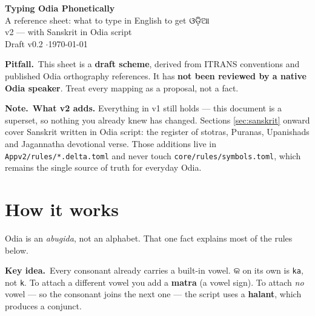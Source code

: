 \documentclass[11pt, a4paper]{article}
\newcommand{\od}[1]{{\odiafont #1}}          %
\newcommand{\kidea}{{\color{midseagreen}\textbf{\textsf{Key idea.}}}\ }
\newcommand{\kpit}{{\color{midseaorange!85!black}\textbf{\textsf{Pitfall.}}}\ }
\newcommand{\knote}{{\color{headerblue}\textbf{\textsf{Note.}}}\ }
\begin{document}

\begin{center}
  {\LARGE\bfseries\color{midseapurple} Typing Odia Phonetically}\\[0.3em]
  {\large A reference sheet: what to type in English to get \od{ଓଡ଼ିଆ}}\\[0.4em]
  {\large\color{midseamagenta} v2 --- with Sanskrit in Odia script}\\[0.5em]
  {\small Draft v0.2 \quad$\cdot$\quad \today}
\end{center}

\vspace{0.5em}

\begin{warnbox}
\kpit This sheet is a \textbf{draft scheme}, derived from ITRANS conventions and
published Odia orthography references. It has \textbf{not been reviewed by a native Odia
speaker}. Treat every mapping as a proposal, not a fact.
\end{warnbox}

\begin{notebox}
\knote \textbf{What v2 adds.} Everything in v1 still holds --- this document is a
superset, so nothing you already knew has changed. Sections \ref{sec:sanskrit} onward
cover Sanskrit written in Odia script: the register of stotras, Puranas,
Upanishads and Jagannatha devotional verse. Those additions live in
\texttt{Appv2/rules/*.delta.toml} and never touch \texttt{core/rules/symbols.toml},
which remains the single source of truth for everyday Odia.
\end{notebox}

\section{How it works}

Odia is an \emph{abugida}, not an alphabet. That one fact explains most of the rules
below.

\begin{keybox}
\kidea Every consonant already carries a built-in vowel. \od{କ} on its own is
\texttt{ka}, not \texttt{k}. To attach a different vowel you add a \textbf{matra}
(a vowel sign). To attach \emph{no} vowel --- so the consonant joins the next one ---
the script uses a \textbf{halant}, which produces a conjunct.
\end{keybox}
\end{document}
